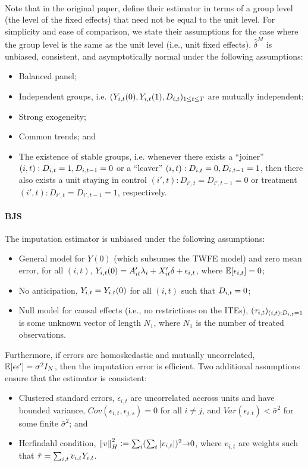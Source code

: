 \documentclass[12pt]{article}
\begin{document}
\paragraph*{\citet{CDH2020}}
Note that in the original paper, \citet{CDH2020} define their estimator in terms of a group level (the level of the fixed effects) that need not be equal to the unit level. For simplicity and ease of comparison, we state their assumptions for the case where the group level is the same as the unit level (i.e., unit fixed effects). $\hat\delta^M$ is unbiased, consistent, and asymptotically normal under the following assumptions:
\begin{itemize}
    \item Balanced panel;
    \item Independent groups, i.e. $(Y_{i,t}(0), Y_{i,t}(1), D_{i,t})_{1\leq t\leq T}$ are mutually independent;
    \item Strong exogeneity;
    \item Common trends; and
    \item The existence of stable groups, i.e. whenever there exists a ``joiner'' $(i,t):D_{i,t}=1, D_{i,t-1}=0$ or a ``leaver'' $(i,t):D_{i,t}=0, D_{i,t-1}=1$, then there also exists a unit staying in control $(i',t):D_{i',t}=D_{i',t-1}=0$ or treatment $(i',t):D_{i',t}=D_{i',t-1}=1$, respectively.
\end{itemize}


\paragraph*{BJS \citeyearpar{BJS2021}} 
The imputation estimator is unbiased under the following assumptions:
\begin{itemize}
    \item General model for $Y(0)$ (which subsumes the TWFE model) and zero mean error, for all $(i,t)$, $Y_{i,t}(0)=A'_{it} \lambda_i + X_{it}'\delta+\epsilon_{i,t}$, where $\mathbb{E}[\epsilon_{i,t}]=0$;
    \item No anticipation, $Y_{i,t}=Y_{i,t}(0)$ for all $(i,t)$ such that $D_{i,t}=0$;
    \item Null model for causal effects (i.e., no restrictions on the ITEs), $(\tau_{i,t})_{(i,t):D_{i,t}=1}$ is some unknown vector of length $N_1$, where $N_1$ is the number of treated observations. 
\end{itemize}

Furthermore, if errors are homoskedastic and mutually uncorrelated, $\mathbb{E}[\epsilon\epsilon']=\sigma^2 I_N$, then the imputation error is efficient.
Two additional assumptions ensure that the estimator is consistent:
\begin{itemize}
    \item Clustered standard errors, $\epsilon_{i,t}$ are uncorrelated accross units and have bounded variance, $Cov(\epsilon_{i,t}, \epsilon_{j,s})=0$ for all $i\neq j$, and $Var(\epsilon_{i,t})<\bar\sigma^2$ for some finite $\bar\sigma^2$; and
    \item Herfindahl condition, $\left\Vert{v} \right\Vert_H^2\vcentcolon=\sum_i(\sum_t \vert v_{i,t}\vert)^2{\rightarrow} 0$, where $v_{i,t}$ are weights such that $\hat\tau=\sum_{i,t} v_{i,t} Y_{i,t}$.
\end{itemize}
\end{document}
